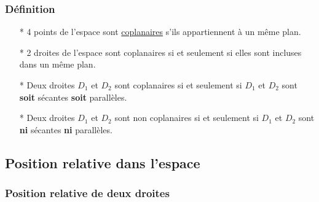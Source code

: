 \subsubsection{Définition}

\begin{itemize}
\item[*] 4 points de l'espace sont \underline{coplanaires} s'ils appartiennent à un même plan.
\item[*] 2 droites de l'espace sont coplanaires si et seulement si elles sont incluses dans un même plan.
\item[*] Deux droites $D_1$ et $D_2$ sont coplanaires si et seulement si $D_1$ et $D_2$ sont \textbf{soit} sécantes \textbf{soit} parallèles.
\item[*] Deux droites $D_1$ et $D_2$ sont non coplanaires si et seulement si $D_1$ et $D_2$ sont \textbf{ni} sécantes \textbf{ni} parallèles.
\end{itemize}

\subsection{Position relative dans l'espace}

\subsubsection{Position relative de deux droites}



